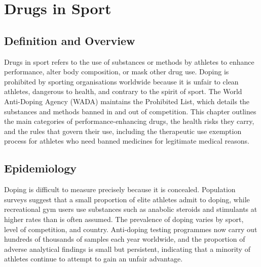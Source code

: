 \chapter{Drugs in Sport}

\section*{Definition and Overview}
Drugs in sport refers to the use of substances or methods by athletes to enhance performance, alter body composition, or mask other drug use. Doping is prohibited by sporting organisations worldwide because it is unfair to clean athletes, dangerous to health, and contrary to the spirit of sport. The World Anti-Doping Agency (WADA) maintains the Prohibited List, which details the substances and methods banned in and out of competition. This chapter outlines the main categories of performance-enhancing drugs, the health risks they carry, and the rules that govern their use, including the therapeutic use exemption process for athletes who need banned medicines for legitimate medical reasons.

\section*{Epidemiology}
Doping is difficult to measure precisely because it is concealed. Population surveys suggest that a small proportion of elite athletes admit to doping, while recreational gym users use substances such as anabolic steroids and stimulants at higher rates than is often assumed. The prevalence of doping varies by sport, level of competition, and country. Anti-doping testing programmes now carry out hundreds of thousands of samples each year worldwide, and the proportion of adverse analytical findings is small but persistent, indicating that a minority of athletes continue to attempt to gain an unfair advantage.

